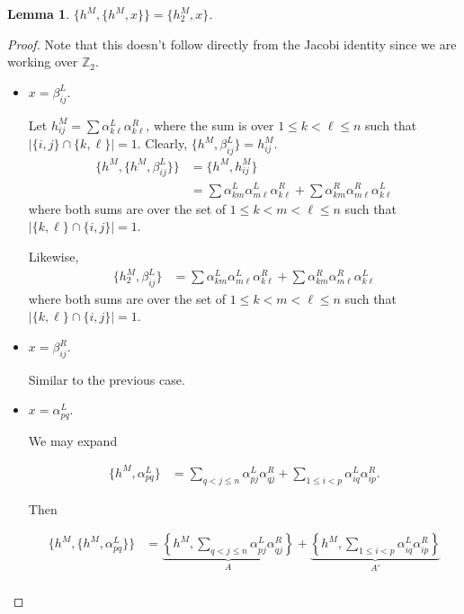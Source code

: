 \documentclass[a4paper,final, reqno]{amsart}
\theoremstyle{plain}
\newtheorem{Lemma}[Th]{Lemma}
\theoremstyle{definition}
\begin{document}
	
	\begin{Lemma} \label{lem:h2M}
		$\{h^M, \{h^M, x\}\} = \{h^M_2, x\}$.
	\end{Lemma}
	\begin{proof}
		Note that this doesn't follow directly from the Jacobi identity since we are working over $\mathbb{Z}_2$. 
		
		\begin{itemize}
			\item $x=\beta_{ij}^L$.
			
			Let $h^M_{ij} = \sum \alpha_{k\ell}^L\alpha_{k\ell}^R$, where the sum is over $1 \leq k < \ell \leq n$ such that $|\{i,j\} \cap \{k,\ell\}| = 1$. Clearly, $\{h^M, \beta_{ij}^L\} = h_{ij}^M$.
			\begin{align*}
				\{h^M, \{h^M, \beta_{ij}^L\}\} &= \{h^M, h^M_{ij}\} \\
				&= \sum \alpha_{km}^L \alpha_{m\ell}^L \alpha_{k\ell}^R + \sum \alpha_{km}^R \alpha_{m\ell}^R \alpha_{k\ell}^L 
			\end{align*}
			where both sums are over the set of $1\leq k<m<\ell\leq n$ such that $|\{k,\ell\} \cap \{i,j\}| = 1$. 
			
			Likewise, 
			\begin{align*}
				\{h_2^M, \beta_{ij}^L\} &= \sum \alpha_{km}^L \alpha_{m\ell}^L \alpha_{k\ell}^R + \sum \alpha_{km}^R \alpha_{m\ell}^R \alpha_{k\ell}^L 
			\end{align*}
			where both sums are over the set of $1\leq k<m<\ell\leq n$ such that $|\{k,\ell\} \cap \{i,j\}| = 1$. 
			
			\item $x=\beta_{ij}^R$.
			
			Similar to the previous case.
			
			\item $x=\alpha_{pq}^L$. 
			
						
			
			We may expand 
			
			\begin{align*}
				\{h^M, \alpha_{pq}^L \} &= \sum_{q < j \leq n} \alpha_{pj}^L\alpha_{qj}^R + \sum_{1\leq i < p} \alpha_{iq}^L\alpha_{ip}^R.
			\end{align*}
			
			Then
			
			\begin{align*}
				\{h^M, \{h^M, \alpha_{pq}^L \}\} &= \underbrace{\left\{h^M, \sum_{q < j \leq n} \alpha_{pj}^L\alpha_{qj}^R \right\}}_{A} + \underbrace{\left\{ h^M, \sum_{1\leq i < p} \alpha_{iq}^L\alpha_{ip}^R \right\}}_{A'} \\
			\end{align*}
			

\end{itemize}
\end{proof}
\end{document}
